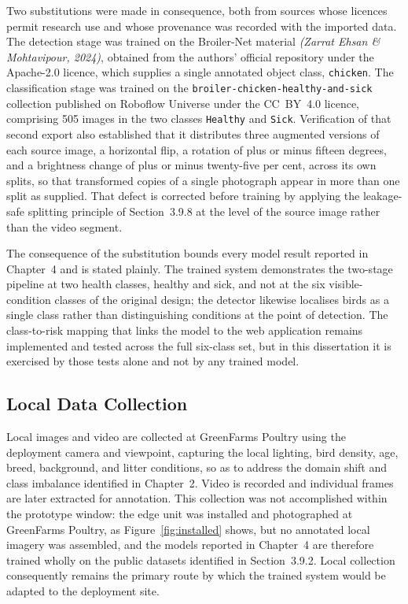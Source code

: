 \documentclass[12pt,a4paper]{report}
\begin{document}
Two substitutions were made in consequence, both from sources whose licences permit research use and whose provenance was recorded with the imported data. The detection stage was trained on the Broiler-Net material \textit{(Zarrat Ehsan \& Mohtavipour, 2024)}, obtained from the authors' official repository under the Apache-2.0 licence, which supplies a single annotated object class, \texttt{chicken}. The classification stage was trained on the \texttt{broiler-chicken-healthy-and-sick} collection published on Roboflow Universe under the CC~BY~4.0 licence, comprising 505 images in the two classes \texttt{Healthy} and \texttt{Sick}. Verification of that second export also established that it distributes three augmented versions of each source image, a horizontal flip, a rotation of plus or minus fifteen degrees, and a brightness change of plus or minus twenty-five per cent, across its own splits, so that transformed copies of a single photograph appear in more than one split as supplied. That defect is corrected before training by applying the leakage-safe splitting principle of Section~3.9.8 at the level of the source image rather than the video segment.

The consequence of the substitution bounds every model result reported in Chapter~4 and is stated plainly. The trained system demonstrates the two-stage pipeline at two health classes, healthy and sick, and not at the six visible-condition classes of the original design; the detector likewise localises birds as a single class rather than distinguishing conditions at the point of detection. The class-to-risk mapping that links the model to the web application remains implemented and tested across the full six-class set, but in this dissertation it is exercised by those tests alone and not by any trained model.

\subsection{Local Data Collection}

Local images and video are collected at GreenFarms Poultry using the deployment camera and viewpoint, capturing the local lighting, bird density, age, breed, background, and litter conditions, so as to address the domain shift and class imbalance identified in Chapter~2. Video is recorded and individual frames are later extracted for annotation. This collection was not accomplished within the prototype window: the edge unit was installed and photographed at GreenFarms Poultry, as Figure~\ref{fig:installed} shows, but no annotated local imagery was assembled, and the models reported in Chapter~4 are therefore trained wholly on the public datasets identified in Section~3.9.2. Local collection consequently remains the primary route by which the trained system would be adapted to the deployment site.
\end{document}
